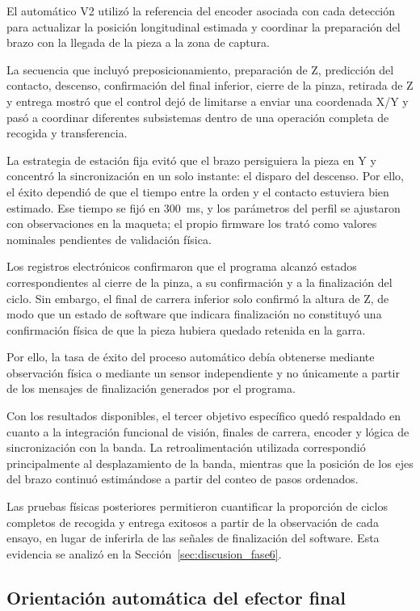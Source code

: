 El automático V2 utilizó la referencia del encoder asociada con cada detección para actualizar la posición longitudinal estimada y coordinar la preparación del brazo con la llegada de la pieza a la zona de captura.

La secuencia que incluyó preposicionamiento, preparación de Z, predicción del contacto, descenso, confirmación del final inferior, cierre de la pinza, retirada de Z y entrega mostró que el control dejó de limitarse a enviar una coordenada X/Y y pasó a coordinar diferentes subsistemas dentro de una operación completa de recogida y transferencia.

La estrategia de estación fija evitó que el brazo persiguiera la pieza en Y y concentró la sincronización en un solo instante: el disparo del descenso. Por ello, el éxito dependió de que el tiempo entre la orden y el contacto estuviera bien estimado. Ese tiempo se fijó en 300~ms, y los parámetros del perfil se ajustaron con observaciones en la maqueta; el propio firmware los trató como valores nominales pendientes de validación física.

Los registros electrónicos confirmaron que el programa alcanzó estados correspondientes al cierre de la pinza, a su confirmación y a la finalización del ciclo. Sin embargo, el final de carrera inferior solo confirmó la altura de Z, de modo que un estado de software que indicara finalización no constituyó una confirmación física de que la pieza hubiera quedado retenida en la garra.

Por ello, la tasa de éxito del proceso automático debía obtenerse mediante observación física o mediante un sensor independiente y no únicamente a partir de los mensajes de finalización generados por el programa.

Con los resultados disponibles, el tercer objetivo específico quedó respaldado en cuanto a la integración funcional de visión, finales de carrera, encoder y lógica de sincronización con la banda. La retroalimentación utilizada correspondió principalmente al desplazamiento de la banda, mientras que la posición de los ejes del brazo continuó estimándose a partir del conteo de pasos ordenados.

Las pruebas físicas posteriores permitieron cuantificar la proporción de ciclos completos de recogida y entrega exitosos a partir de la observación de cada ensayo, en lugar de inferirla de las señales de finalización del software. Esta evidencia se analizó en la Sección~\ref{sec:discusion_fase6}.

\subsection{Orientación automática del efector final}


